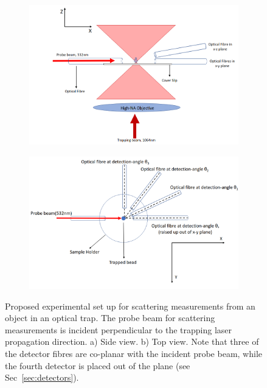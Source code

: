 \documentclass[preprint,  3p]{elsarticle}
\begin{document}
\begin{figure} [h]
\centering
\begin{subfigure}{0.45\textwidth}
	\subcaption{}
	\includegraphics[width=\textwidth, height=0.25\textheight]{./Images/fig1a.png}
\end{subfigure}
\begin{subfigure}{0.45\textwidth}
	\subcaption{}
	\includegraphics[width=\textwidth, height=0.25\textheight]{./Images/fig1b.png}
\end{subfigure}
\caption{\label{fig:setup}
  Proposed experimental set up for scattering measurements from an object in an optical trap. The probe beam for scattering measurements is incident perpendicular to the trapping laser propagation direction. a) Side view. b) Top view. Note that three of the detector fibres are co-planar with the incident probe beam, while the fourth detector is placed out of the plane (see Sec~\ref{sec:detectors}).
%
}
\end{figure}
\end{document}
